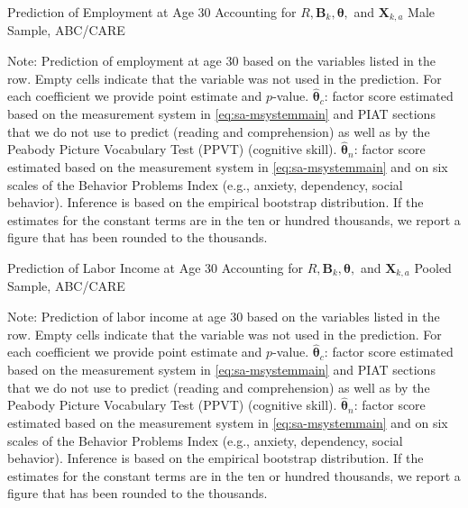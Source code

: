 \begin{table}
\begin{threeparttable}
\caption{Prediction of Employment at Age 30 Accounting for $R, \bm{B}_k, \bm{\theta},$ and $\bm{X}_{k,a}$ Male Sample, ABC/CARE}
\label{table:end2}
\centering
\scriptsize

\begin{tablenotes}
\footnotesize
\item Note: Prediction of employment at age 30 based on the variables listed in the row. Empty cells indicate that the variable was not used in the prediction. For each coefficient we provide point estimate and $p$-value. $\hat{\bm{\theta}}_{c}$: factor score estimated based on the measurement system in \eqref{eq:sa-msystemmain} and PIAT sections that we do not use to predict (reading and comprehension) as well as by the Peabody Picture Vocabulary Test (PPVT) (cognitive skill). $\hat{\bm{\theta}}_{n}$: factor score estimated based on the measurement system in \eqref{eq:sa-msystemmain} and on six scales of the Behavior Problems Index (e.g., anxiety, dependency, social behavior). Inference is based on the empirical bootstrap distribution. If the estimates for the constant terms are in the ten or hundred thousands, we report a figure that has been rounded to the thousands.
\end{tablenotes}
\end{threeparttable}
\end{table}

\begin{table}
\begin{threeparttable}
\caption{Prediction of Labor Income at Age 30 Accounting for $R, \bm{B}_k, \bm{\theta},$ and $\bm{X}_{k,a}$ Pooled Sample, ABC/CARE}
\label{table:end2}
\centering
\scriptsize

\begin{tablenotes}
\footnotesize
\item Note: Prediction of labor income at age 30 based on the variables listed in the row. Empty cells indicate that the variable was not used in the prediction. For each coefficient we provide point estimate and $p$-value. $\hat{\bm{\theta}}_{c}$: factor score estimated based on the measurement system in \eqref{eq:sa-msystemmain} and PIAT sections that we do not use to predict (reading and comprehension) as well as by the Peabody Picture Vocabulary Test (PPVT) (cognitive skill). $\hat{\bm{\theta}}_{n}$: factor score estimated based on the measurement system in \eqref{eq:sa-msystemmain} and on six scales of the Behavior Problems Index (e.g., anxiety, dependency, social behavior). Inference is based on the empirical bootstrap distribution. If the estimates for the constant terms are in the ten or hundred thousands, we report a figure that has been rounded to the thousands.
\end{tablenotes}
\end{threeparttable}
\end{table}

